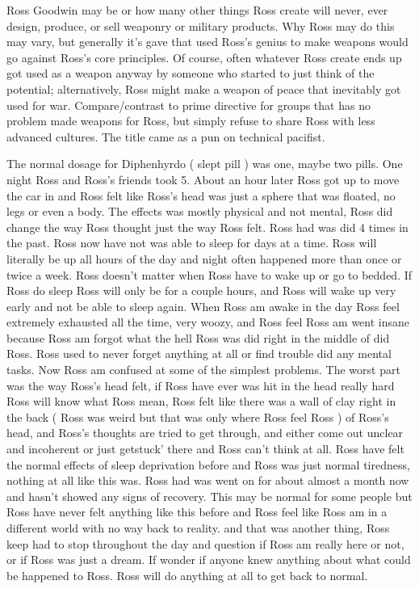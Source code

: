 \documentclass[12pt]{book}
\begin{document}
Ross Goodwin may be or how many other things Ross create  will never, ever design, produce, or sell weaponry or military products. Why Ross may do this may vary, but generally it's gave that used Ross's genius to make weapons would go against Ross's core principles. Of course, often whatever Ross create ends up got used as a weapon anyway by someone who started to just think of the potential; alternatively, Ross might make a weapon of peace that inevitably got used for war. Compare/contrast to prime directive for groups that has no problem made weapons for Ross, but simply refuse to share Ross with less advanced cultures. The title came as a pun on technical pacifist.



The normal dosage for Diphenhyrdo ( slept pill ) was one, maybe two pills. One night Ross and Ross's friends took 5. About an hour later Ross got up to move the car in and Ross felt like Ross's head was just a sphere that was floated, no legs or even a body. The effects was mostly physical and not mental, Ross did change the way Ross thought just the way Ross felt. Ross had was did 4 times in the past. Ross now have not was able to sleep for days at a time. Ross will literally be up all hours of the day and night often happened more than once or twice a week. Ross doesn't matter when Ross have to wake up or go to bedded. If Ross do sleep Ross will only be for a couple hours, and Ross will wake up very early and not be able to sleep again. When Ross am awake in the day Ross feel extremely exhausted all the time, very woozy, and Ross feel Ross am went insane because Ross am forgot what the hell Ross was did right in the middle of did Ross. Ross used to never forget anything at all or find trouble did any mental tasks. Now Ross am confused at some of the simplest problems. The worst part was the way Ross's head felt, if Ross have ever was hit in the head really hard Ross will know what Ross mean, Ross felt like there was a wall of clay right in the back ( Ross was weird but that was only where Ross feel Ross ) of Ross's head, and Ross's thoughts are tried to get through, and either come out unclear and incoherent or just getstuck' there and Ross can't think at all. Ross have felt the normal effects of sleep deprivation before and Ross was just normal tiredness, nothing at all like this was. Ross had was went on for about almost a month now and hasn't showed any signs of recovery. This may be normal for some people but Ross have never felt anything like this before and Ross feel like Ross am in a different world with no way back to reality. and that was another thing, Ross keep had to stop throughout the day and question if Ross am really here or not, or if Ross was just a dream. If wonder if anyone knew anything about what could be happened to Ross. Ross will do anything at all to get back to normal.
\end{document}
